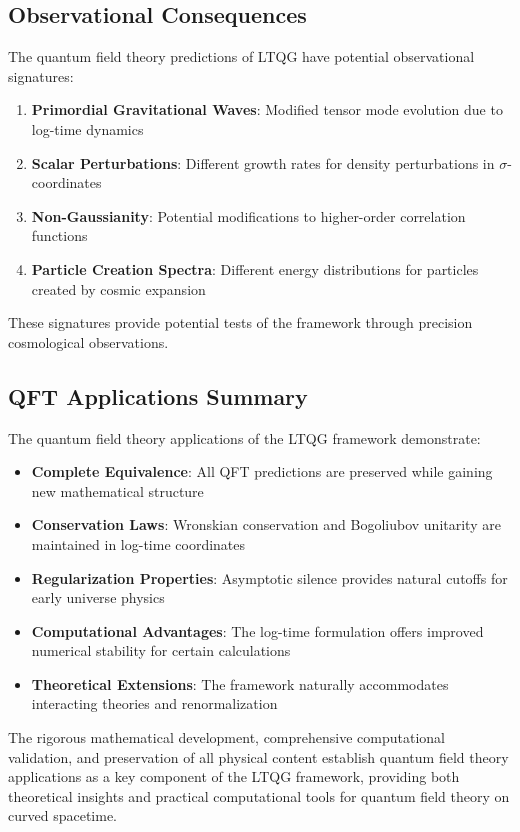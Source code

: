 \subsection{Observational Consequences}
\label{subsec:qft_observational_consequences}

The quantum field theory predictions of LTQG have potential observational signatures:

\begin{enumerate}
\item \textbf{Primordial Gravitational Waves}: Modified tensor mode evolution due to log-time dynamics
\item \textbf{Scalar Perturbations}: Different growth rates for density perturbations in $\sigma$-coordinates
\item \textbf{Non-Gaussianity}: Potential modifications to higher-order correlation functions
\item \textbf{Particle Creation Spectra}: Different energy distributions for particles created by cosmic expansion
\end{enumerate}

These signatures provide potential tests of the framework through precision cosmological observations.

\subsection{QFT Applications Summary}

The quantum field theory applications of the LTQG framework demonstrate:

\begin{itemize}
\item \textbf{Complete Equivalence}: All QFT predictions are preserved while gaining new mathematical structure
\item \textbf{Conservation Laws}: Wronskian conservation and Bogoliubov unitarity are maintained in log-time coordinates
\item \textbf{Regularization Properties}: Asymptotic silence provides natural cutoffs for early universe physics
\item \textbf{Computational Advantages}: The log-time formulation offers improved numerical stability for certain calculations
\item \textbf{Theoretical Extensions}: The framework naturally accommodates interacting theories and renormalization
\end{itemize}

The rigorous mathematical development, comprehensive computational validation, and preservation of all physical content establish quantum field theory applications as a key component of the LTQG framework, providing both theoretical insights and practical computational tools for quantum field theory on curved spacetime.